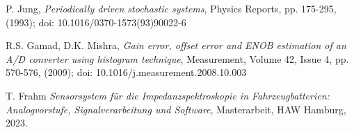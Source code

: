 \begin{thebibliography}{[99]}
	P. Jung, \textit{Periodically driven stochastic systems}, Physics Reports,  pp. 175-295, (1993); doi:  10.1016/0370-1573(93)90022-6 

	R.S. Gamad, D.K. Mishra,
	\textit{Gain error, offset error and ENOB estimation of an A/D converter using histogram technique},
	Measurement, Volume 42, Issue 4, pp. 570-576, (2009); doi: 10.1016/j.measurement.2008.10.003 

	T. Frahm \textit{Sensorsystem für die Impedanzspektroskopie in Fahrzeugbatterien: Analogvorstufe, Signalverarbeitung und Software}, Masterarbeit, HAW Hamburg, 2023.
	
\end{thebibliography}
 